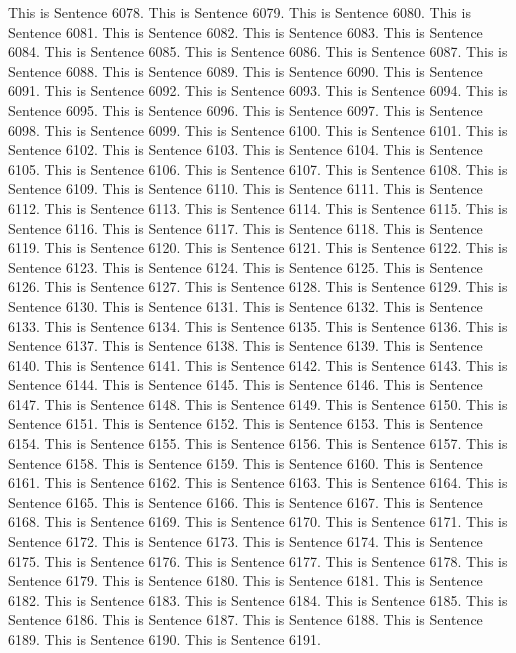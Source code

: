 \documentclass{article}
\begin{document}
This is Sentence 6078.
This is Sentence 6079.
This is Sentence 6080.
This is Sentence 6081.
This is Sentence 6082.
This is Sentence 6083.
This is Sentence 6084.
This is Sentence 6085.
This is Sentence 6086.
This is Sentence 6087.
This is Sentence 6088.
This is Sentence 6089.
This is Sentence 6090.
This is Sentence 6091.
This is Sentence 6092.
This is Sentence 6093.
This is Sentence 6094.
This is Sentence 6095.
This is Sentence 6096.
This is Sentence 6097.
This is Sentence 6098.
This is Sentence 6099.
This is Sentence 6100.
This is Sentence 6101.
This is Sentence 6102.
This is Sentence 6103.
This is Sentence 6104.
This is Sentence 6105.
This is Sentence 6106.
This is Sentence 6107.
This is Sentence 6108.
This is Sentence 6109.
This is Sentence 6110.
This is Sentence 6111.
This is Sentence 6112.
This is Sentence 6113.
This is Sentence 6114.
This is Sentence 6115.
This is Sentence 6116.
This is Sentence 6117.
This is Sentence 6118.
This is Sentence 6119.
This is Sentence 6120.
This is Sentence 6121.
This is Sentence 6122.
This is Sentence 6123.
This is Sentence 6124.
This is Sentence 6125.
This is Sentence 6126.
This is Sentence 6127.
This is Sentence 6128.
This is Sentence 6129.
This is Sentence 6130.
This is Sentence 6131.
This is Sentence 6132.
This is Sentence 6133.
This is Sentence 6134.
This is Sentence 6135.
This is Sentence 6136.
This is Sentence 6137.
This is Sentence 6138.
This is Sentence 6139.
This is Sentence 6140.
This is Sentence 6141.
This is Sentence 6142.
This is Sentence 6143.
This is Sentence 6144.
This is Sentence 6145.
This is Sentence 6146.
This is Sentence 6147.
This is Sentence 6148.
This is Sentence 6149.
This is Sentence 6150.
This is Sentence 6151.
This is Sentence 6152.
This is Sentence 6153.
This is Sentence 6154.
This is Sentence 6155.
This is Sentence 6156.
This is Sentence 6157.
This is Sentence 6158.
This is Sentence 6159.
This is Sentence 6160.
This is Sentence 6161.
This is Sentence 6162.
This is Sentence 6163.
This is Sentence 6164.
This is Sentence 6165.
This is Sentence 6166.
This is Sentence 6167.
This is Sentence 6168.
This is Sentence 6169.
This is Sentence 6170.
This is Sentence 6171.
This is Sentence 6172.
This is Sentence 6173.
This is Sentence 6174.
This is Sentence 6175.
This is Sentence 6176.
This is Sentence 6177.
This is Sentence 6178.
This is Sentence 6179.
This is Sentence 6180.
This is Sentence 6181.
This is Sentence 6182.
This is Sentence 6183.
This is Sentence 6184.
This is Sentence 6185.
This is Sentence 6186.
This is Sentence 6187.
This is Sentence 6188.
This is Sentence 6189.
This is Sentence 6190.
This is Sentence 6191.
\end{document}

